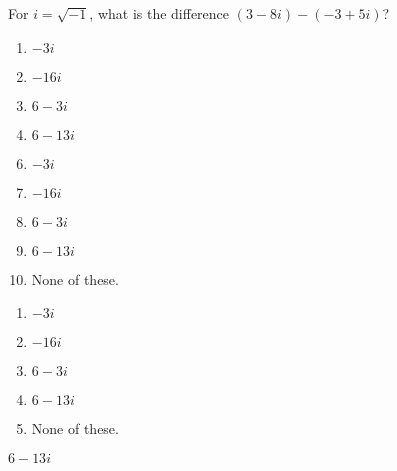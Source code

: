  
For $i=\sqrt{-1}$, what is the difference $(3-8i)-(-3+5i)$?


\ifsat
	\begin{enumerate}[label=\Alph*)]
		\item $-3i$
		\item $-16i$
		\item $6-3i$
		\item $6-13i$ %
	\end{enumerate}
\else
\fi

\ifacteven
	\begin{enumerate}[label=\textbf{\Alph*.},itemsep=\fill,align=left]
		\setcounter{enumii}{5}
		\item $-3i$
		\item $-16i$
		\item $6-3i$
		\addtocounter{enumii}{1}
		\item $6-13i$ %
		\item None of these. 
	\end{enumerate}
\else
\fi

\ifactodd
	\begin{enumerate}[label=\textbf{\Alph*.},itemsep=\fill,align=left]
		\item $-3i$
		\item $-16i$
		\item $6-3i$
		\item $6-13i$ %
		\item None of these. 
	\end{enumerate}
\else
\fi

\ifgridin
 $6-13i$ %

\else
\fi

